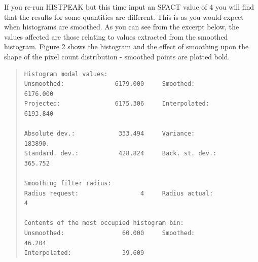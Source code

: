\documentclass[twoside,11pt]{article}
\newenvironment{myquote}{\begin{quote}\begin{small}}{\end{small}\end{quote}}
\begin{document}
If you re-run HISTPEAK but this time input an SFACT value of 4 you will find 
that the results for some quantities are different. This is as you would 
expect when histograms are smoothed. As you can see from the excerpt below, 
the values affected are those relating to values extracted from the 
smoothed histogram. Figure 2 shows the histogram and the effect 
of smoothing upon the shape of the pixel count distribution - smoothed
points are plotted bold.

\newpage
\begin{myquote}
\begin{verbatim}
Histogram modal values:
Unsmoothed:              6179.000     Smoothed:             6176.000
Projected:               6175.306     Interpolated:         6193.840

Absolute dev.:            333.494     Variance:              183890.
Standard. dev.:           428.824     Back. st. dev.:        365.752

Smoothing filter radius:
Radius request:                 4     Radius actual:               4

Contents of the most occupied histogram bin:
Unsmoothed:                60.000     Smoothed:               46.204
Interpolated:              39.609
\end{verbatim}
\end{myquote}
\end{document}

